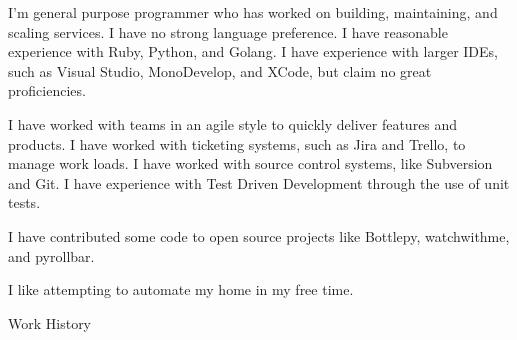 \documentclass[a4paper]{article}
\begin{document}
    \begingroup
        \fontsize{8pt}{12pt}\selectfont
        \noindent
        I'm general purpose programmer who has worked on building, maintaining, and scaling services. I have no strong language preference. I have reasonable experience with Ruby, Python, and Golang. I have experience with larger IDEs, such as Visual Studio, MonoDevelop, and XCode, but claim no great proficiencies. \\
        \par
        \noindent
        I have worked with teams in an agile style to quickly deliver features and products. I have worked with ticketing systems, such as Jira and Trello, to manage work loads. I have worked with source control systems, like Subversion and Git. I have experience with Test Driven Development through the use of unit tests. \\
        \par
        \noindent
        I have contributed some code to open source projects like Bottlepy, watchwithme, and pyrollbar.\\
        \par
        \noindent
        I like attempting to automate my home in my free time.\\
    \endgroup

    \begin{Large}
        \noindent
        Work History
    \end{Large}
    \begingroup
        \fontsize{8pt}{12pt}\selectfont
\end{document}
